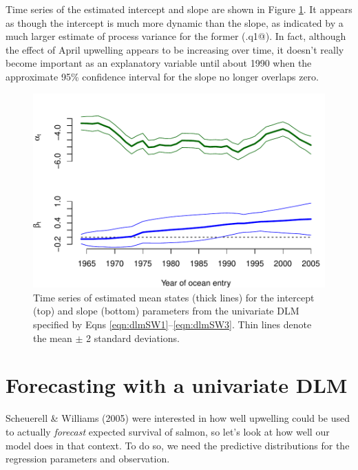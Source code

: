 \documentclass[10pt]{article}
\begin{document}
Time series of the estimated intercept and slope are shown in Figure \ref{fig:CSX.fig2}. It appears as though the intercept is much more dynamic than the slope, as indicated by a much larger estimate of process variance for the former (\verb@Q.q1@). In fact, although the effect of April upwelling appears to be increasing over time, it doesn't really become important as an explanatory variable until about 1990 when the approximate 95\% confidence interval for the slope no longer overlaps zero.
\begin{figure}[htp]
\begin{center}
\includegraphics{DLM_lab_5-plotdlm1}
\end{center}
\caption{Time series of estimated mean states (thick lines) for the intercept (top) and slope (bottom) parameters from the univariate DLM specified by Eqns \ref{eqn:dlmSW1}--\ref{eqn:dlmSW3}. Thin lines denote the mean $\pm$ 2 standard deviations.}
\label{fig:CSX.fig2}
\end{figure}
\section{Forecasting with a univariate DLM}
Scheuerell \& Williams (2005) were interested in how well upwelling could be used to actually \textit{forecast} expected survival of salmon, so let's look at how well our model does in that context. To do so, we need the predictive distributions for the regression parameters and observation.
\end{document}
